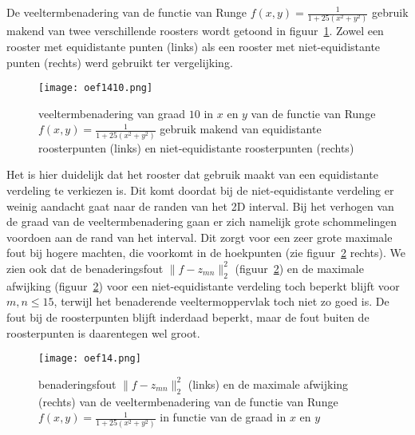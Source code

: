 De veeltermbenadering van de functie van Runge $f(x,y)=\frac{1}{1+25(x^2+y^2)}$ gebruik makend van twee verschillende roosters wordt getoond in figuur~\ref{fig:oef14resultaat}.
Zowel een rooster met equidistante punten (links) als een rooster met niet-equidistante punten (rechts) werd gebruikt ter vergelijking.

\begin{figure}[H]
    \centering
    \texttt{[image: oef1410.png]}
    \caption{veeltermbenadering van graad $10$ in $x$ en $y$ van de functie van Runge $f(x,y)=\frac{1}{1+25(x^2+y^2)}$ gebruik makend van equidistante roosterpunten (links) en niet-equidistante roosterpunten (rechts)}
    \label{fig:oef14resultaat}
\end{figure}

Het is hier duidelijk dat het rooster dat gebruik maakt van een equidistante verdeling te verkiezen is. Dit komt doordat bij de niet-equidistante verdeling er weinig aandacht gaat naar de randen van het 2D interval. Bij het verhogen van de graad van de veeltermbenadering gaan er zich namelijk grote schommelingen voordoen aan de rand van het interval. Dit zorgt voor een zeer grote maximale fout bij hogere machten, die voorkomt in de hoekpunten (zie figuur~\ref{fig:oef14} rechts). We zien ook dat de benaderingsfout $\lVert f-z_{mn} \rVert_2^2$ (figuur~\ref{fig:oef14}) en de maximale afwijking (figuur~\ref{fig:oef14}) voor een niet-equidistante verdeling toch beperkt blijft voor $m,n \leq 15$, terwijl het benaderende veeltermoppervlak toch niet zo goed is. De fout bij de roosterpunten blijft inderdaad beperkt, maar de fout buiten de roosterpunten is daarentegen wel groot.

\begin{figure}[H]
    \centering
    \texttt{[image: oef14.png]}
    \caption{benaderingsfout $\lVert f-z_{mn} \rVert_2^2$ (links) en de maximale afwijking (rechts) van de veeltermbenadering van de functie van Runge $f(x,y)=\frac{1}{1+25(x^2+y^2)}$ in functie van de graad in $x$ en $y$}
    \label{fig:oef14}
\end{figure}

